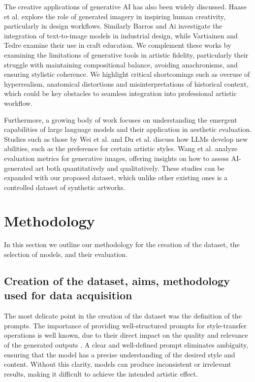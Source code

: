 \documentclass[sn-mathphys]{sn-jnl}
\begin{document}
The creative applications of generative AI has also been widely discussed. Haase et al. \cite{inspiring-Haase} explore the role of generated imagery in inspiring human creativity, particularly in design workflows. Similarly Barros and Ai \cite{designing-barros} investigate the integration of text-to-image models in industrial design, while Vartiainen and Tedre \cite{craft-edu} examine their use in craft education. We complement these works by examining the limitations of generative tools in artistic fidelity, particularly their struggle with maintaining compositional balance, avoiding anachronisms, and ensuring stylistic coherence. We highlight critical shortcomings such as overuse of hyperrealism, anatomical distortions and misinterpretations of historical context, which could be key obstacles to seamless integration into professional artistic workflow.  

Furthermore, a growing body of work focuses on understanding the emergent capabilities of large language models and their application in aesthetic evaluation. Studies such as those by Wei et al. \cite{emergent} and Du et al. \cite{loss_perspective} discuss how LLMs develop new abilities, such as the preference for certain artistic styles. Wang et al. \cite{evaluation-metrics} analyze evaluation metrics for generative images, offering insights on how to assess AI-generated art both quantitatively and qualitatively. These studies can be expanded with our proposed dataset, which unlike other existing ones is a controlled dataset of synthetic artworks. 

\section{Methodology}
\label{sec:methodology}
In this section we outline our methodology for the creation of
the dataset, the selection of models, and their evaluation.

\subsection{Creation of the dataset, aims, methodology used for data acquisition}

The most delicate point in the creation of the dataset was
the definition of the prompts. The importance of providing well-structured prompts for style-transfer operations is well known,
due to their direct impact on the quality and relevance of the generated outputs \cite{prompts-Oppenlaendr,prompts-Sanchez23,optimizing-prompts}. A clear and well-defined prompt eliminates ambiguity, ensuring that the model has a precise understanding of the desired style and content. Without this clarity, models can produce inconsistent or irrelevant results, making it difficult to achieve the intended artistic effect. 
\end{document}
